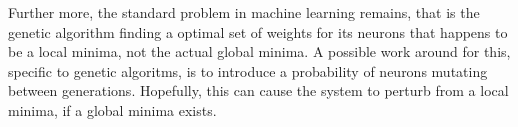 \documentclass{article}
\begin{document}
Further more, the standard problem in machine learning remains, that is the 
genetic algorithm finding a optimal set of weights for its neurons that
happens to be a local
minima, not the actual global minima. A possible work around for this, 
specific to genetic algoritms, is to introduce a probability of neurons 
mutating between generations. Hopefully, this can cause the system to perturb
from a local minima, if a global minima exists.

\printbibliography
\end{document}
